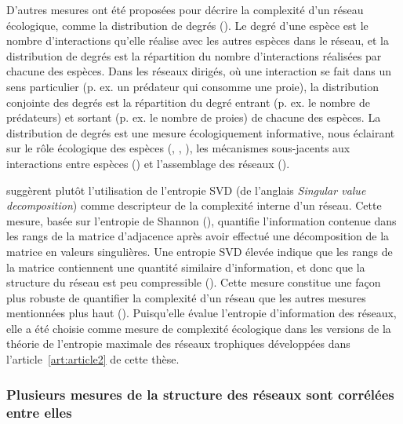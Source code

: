 D'autres mesures ont été proposées pour décrire la complexité d'un réseau
écologique, comme la distribution de degrés (\cite{Landi2018Complexity}). Le
degré d'une espèce est le nombre d'interactions qu'elle réalise avec les autres
espèces dans le réseau, et la distribution de degrés est la répartition du
nombre d'interactions réalisées par chacune des espèces. Dans les réseaux
dirigés, où une interaction se fait dans un sens particulier (p. ex. un
prédateur qui consomme une proie), la distribution conjointe des degrés est la
répartition du degré entrant (p. ex. le nombre de prédateurs) et sortant (p. ex.
le nombre de proies) de chacune des espèces. La distribution de degrés est une
mesure écologiquement informative, nous éclairant sur le rôle écologique des
espèces (\cite{Sole2001Complexity}, \cite{Dunne2002Network},
\cite{Memmott2004Tolerance}), les mécanismes sous-jacents aux interactions entre
espèces (\cite{Williams2011Biology}) et l'assemblage des réseaux
(\cite{Vazquez2005Degree}). 

\textcite{Strydom2021Svd} suggèrent plutôt l'utilisation de l'entropie SVD (de
l'anglais \textit{Singular value decomposition}) comme descripteur de la
complexité interne d'un réseau. Cette mesure, basée sur l'entropie de Shannon
(\cite{Shannon1948Mathematical}), quantifie l'information contenue dans les
rangs de la matrice d'adjacence après avoir effectué une décomposition de la
matrice en valeurs singulières. Une entropie SVD élevée indique que les rangs de
la matrice contiennent une quantité similaire d'information, et donc que la
structure du réseau est peu compressible (\cite{Gu2016How}). Cette mesure
constitue une façon plus robuste de quantifier la complexité d'un réseau que les
autres mesures mentionnées plus haut (\cite{Strydom2021Svd}). Puisqu'elle évalue
l'entropie d'information des réseaux, elle a été choisie comme mesure de
complexité écologique dans les versions de la théorie de l'entropie maximale des
réseaux trophiques développées dans l'article~\ref{art:article2} de cette thèse. 

\subsubsection{Plusieurs mesures de la structure des réseaux sont corrélées entre elles} 

